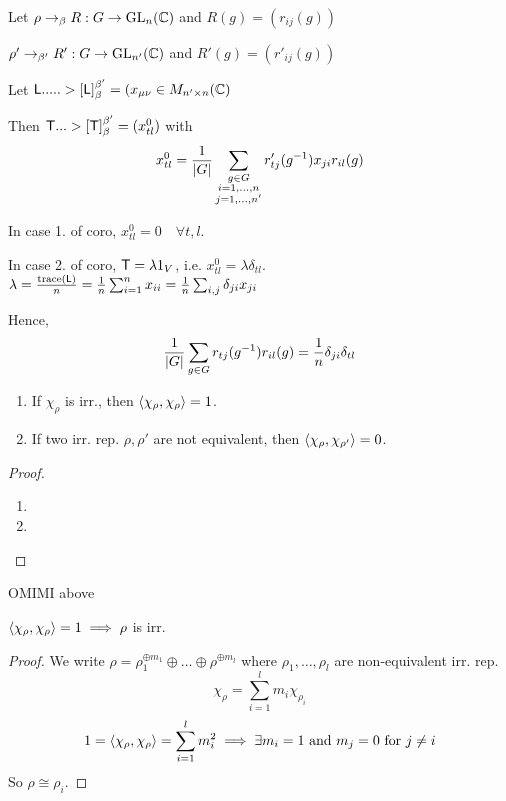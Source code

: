 \begin{remark}
  Let $\rho \to_\beta R: G \to \text{GL}_n(\mathbb{C})$ and $R(g) = (r_{ij}(g))$

  $\rho' \to_{\beta'} R': G \to \text{GL}_{n'}(\mathbb{C})$ and $R'(g) = (r'_{ij}(g))$

  Let ${\sf L} .....> [{\sf L}]^{\beta'}_\beta =
  (x_{\mu\nu} \in M_{n' \times n}(\mathbb{C})$

  Then ${\sf T} ...> [{\sf T}]^{\beta'}_\beta = (x^0_{tl})$ with
  \[
    x^0_{tl} = \frac{1}{\lvert G\rvert}
    \sum_{\substack{g\in G \\ i=1,\dots, n \\ j=1,\dots, n'}}
    r'_{tj}(g^{-1})x_{ji}r_{il}(g)
  \]

  In case 1. of coro, $x^0_{tl} = 0 \quad \forall t, l$.


  In case 2. of coro, ${\sf T} = \lambda 1_V$, i.e.
  $x^0_{tl} = \lambda \delta_{tl}$.
  $\lambda = \frac{\operatorname{trace}({\sf L})}{n} = \frac{1}{n} \sum_{i=1}^n x_{ii}
  = \frac{1}{n} \sum_{i,j} \delta_{ji}x_{ji}$

  Hence,
  \[
    \frac{1}{\lvert G\rvert} \sum_{g\in G}
    r_{tj}(g^{-1})r_{il}(g) = \frac{1}{n} \delta_{ji}\delta_{tl}
  \]
\end{remark}

\begin{prop} \mbox{}
  \begin{enumerate}
    \item If $\chi_\rho$ is irr., then $\langle\chi_\rho, \chi_\rho\rangle = 1$.
    \item If two irr. rep. $\rho, \rho'$ are not equivalent, then
      $\langle\chi_\rho, \chi_{\rho'}\rangle = 0$.
  \end{enumerate}

  \begin{proof} \mbox{}
    \begin{enumerate}
      \item
      \item 
    \end{enumerate}
  \end{proof}
\end{prop}

OMIMI above


\begin{remark}
  $\langle\chi_\rho,\chi_\rho\rangle = 1 \implies \rho$ is irr.
  \begin{proof}
    We write $\rho = \rho_1^{\oplus m_1}\oplus\dots\oplus\rho^{\oplus m_l}$
    where $\rho_1, \dots, \rho_l$ are non-equivalent irr. rep.
    \[ \chi_\rho = \sum_{i=1}^l m_i \chi_{\rho_i} \]
    \[
      1 = \langle\chi_\rho, \chi_\rho\rangle = \sum_{i=1}^l m_i^2
      \implies \exists m_i = 1 \text{~and~} m_j = 0 \text{~for~} j \ne i
    \]
    So $\rho \cong \rho_i$.
  \end{proof}
\end{remark}
